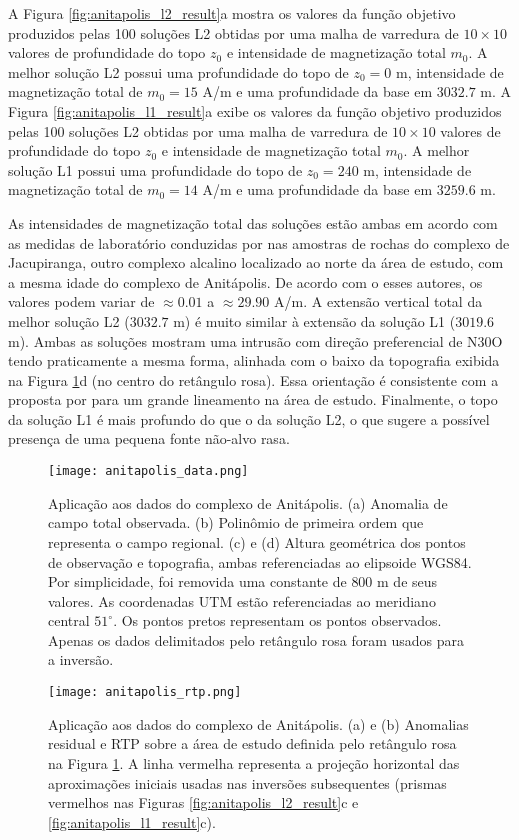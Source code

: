 A Figura \ref{fig:anitapolis_l2_result}a mostra os valores da função objetivo produzidos pelas 100 soluções L2 obtidas por uma malha de varredura de $10 \times 10$ valores de profundidade do topo $z_{0}$ e intensidade de magnetização total $m_{0}$.
A melhor solução L2 possui uma profundidade do topo de $z_{0} = 0$ m, intensidade de magnetização total de $m_{0} = 15$ A/m e uma profundidade da base em $3032.7$ m.
A Figura \ref{fig:anitapolis_l1_result}a exibe os valores da função objetivo produzidos pelas 100 soluções L2 obtidas por uma malha de varredura de $10 \times 10$ valores de profundidade do topo $z_{0}$ e intensidade de magnetização total $m_{0}$.
A melhor solução L1 possui uma profundidade do topo de $z_{0} = 240$ m, intensidade de magnetização total de $m_{0} = 14$ A/m e uma profundidade da base em $3259.6$ m.

As intensidades de magnetização total das soluções estão ambas em acordo com as medidas de laboratório conduzidas por \citet{valdivia_etal2009} nas amostras de rochas do complexo de Jacupiranga, outro complexo alcalino localizado ao norte da área de estudo, com a mesma idade do complexo de Anitápolis. De acordo com o esses autores,
os valores podem variar de $\approx 0.01$ a $\approx 29.90$ A/m.
A extensão vertical total da melhor solução L2 ($3032.7$ m) é muito similar à extensão da solução L1 ($3019.6$ m). 
Ambas as soluções mostram uma intrusão com direção preferencial de N30O tendo praticamente a mesma forma,
alinhada com o baixo da topografia exibida na Figura \ref{fig:anitapolis_data}d (no centro do retângulo rosa). 
Essa orientação é consistente com a proposta por \citet{horbach_marimon1980} para um grande lineamento na área de estudo.
Finalmente, o topo da solução L1 é mais profundo do que o da solução L2, 
o que sugere a possível presença de uma pequena fonte não-alvo rasa.

\pagebreak
\begin{figure}[!htb]
	\texttt{[image: anitapolis\_data.png]}
	\caption{Aplicação aos dados do complexo de Anitápolis. 
		(a) Anomalia de campo total observada.
		(b) Polinômio de primeira ordem que representa o campo regional.
		(c) e (d) Altura geométrica dos pontos de observação e topografia,
		ambas referenciadas ao elipsoide WGS84. Por simplicidade, foi removida uma constante de $800$ m de seus valores. As coordenadas UTM estão referenciadas ao meridiano central $51^{\circ}$. Os pontos pretos representam os pontos observados. Apenas os dados delimitados pelo retângulo rosa foram usados para a inversão. 
	}
	\label{fig:anitapolis_data}
\end{figure}
\pagebreak
\begin{figure}[!htb]
	\texttt{[image: anitapolis\_rtp.png]}
	\caption{Aplicação aos dados do complexo de Anitápolis. 
		(a) e (b) Anomalias residual e RTP sobre a área de estudo definida pelo retângulo rosa na Figura \ref{fig:anitapolis_data}.
		A linha vermelha representa a projeção horizontal das aproximações iniciais usadas nas inversões subsequentes (prismas vermelhos nas Figuras 
		\ref{fig:anitapolis_l2_result}c e \ref{fig:anitapolis_l1_result}c).
	}
	\label{fig:anitapolis_rtp_residual}
\end{figure}

